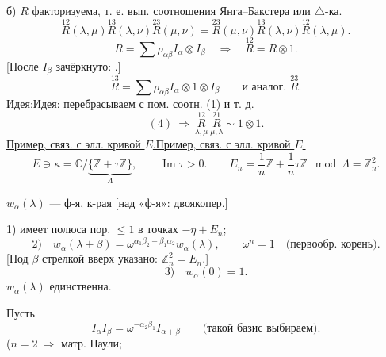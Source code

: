 \documentclass[11pt]{article}
\theoremstyle{definition}
\theoremstyle{remark}
\newcommand{\Unclear}[3]{%
  \begingroup\color{orange!70!black}%
  [Unresolved reading #1/#2: #3]\endgroup%
}
\renewcommand{\Unclear}[3]{%
  \begingroup\color{orange!65!black}%
  \ifmmode\text{[неясно: #3]}\else[неясно: #3]\fi\endgroup%
}
\let\DiplomaticMathUnderline\underline
\renewcommand{\underline}[1]{\ifmmode\DiplomaticMathUnderline{#1}\else\uline{#1}\fi}
\begin{document}
б) $R$ факторизуема, т. е. вып. соотношения Янга--Бакстера или $\triangle$-ка.
\begin{equation*}
\overset{12}{R}(\lambda,\mu)\overset{13}{R}(\lambda,\nu)\overset{23}{R}(\mu,\nu)
=\overset{23}{R}(\mu,\nu)\overset{13}{R}(\lambda,\nu)\overset{12}{R}(\lambda,\mu). \tag{4}
\end{equation*}
\begin{equation*}
R=\sum\rho_{\alpha\beta}I_\alpha\otimes I_\beta
\quad\Rightarrow\quad \overset{12}{R}=R\otimes1.
\end{equation*}
[После $I_\beta$ зачёркнуто:
\Unclear{GELFAND-P001165}{cancelled-r12}{$=\overset{12}{R}$; начало записи под штриховкой}.]
\begin{equation*}
\overset{13}{R}=\sum\rho_{\alpha\beta}I_\alpha\otimes1\otimes I_\beta
\qquad\text{и аналог. }\overset{23}{R}.
\end{equation*}
\underline{Идея:} перебрасываем с пом. соотн. (1) и т. д.
\begin{equation*}
(4)\ \Rightarrow\ 
\underset{\lambda,\mu}{\overset{12}{R}}\ 
\underset{\mu,\lambda}{\overset{21}{R}}\sim1\otimes1. \tag{5}
\end{equation*}
\underline{Пример, связ. с элл. кривой $E$.}
\begin{equation*}
E\ni\kappa=\mathbb C/\underbrace{\{\mathbb Z+\tau\mathbb Z\}}_{\Lambda},
\qquad \operatorname{Im}\tau>0.
\qquad
E_n=\frac1n\mathbb Z+\frac1n\tau\mathbb Z\ \bmod\Lambda
=\mathbb Z_n^2.
\end{equation*}
\Unclear{GELFAND-P001165}{curve-letter}{В записи $E\ni\kappa=\mathbb C/\{\mathbb Z+\tau\mathbb Z\}$
буква после $\ni$: $\kappa$ или $k$.}

$w_\alpha(\lambda)$ --- ф-я, к-рая [над «ф-я»: двоякопер.]

1) имеет полюса пор. $\le1$ в точках $-\eta+E_n$;
\begin{equation*}
2)\quad w_\alpha(\lambda+\beta)
=\omega^{\alpha_1\beta_2-\beta_1\alpha_2}w_\alpha(\lambda),
\qquad \omega^n=1\quad\text{(первообр. корень)}.
\end{equation*}
[Под $\beta$ стрелкой вверх указано: $\mathbb Z_n^2=E_n$.]
\begin{equation*}
3)\quad w_\alpha(0)=1.
\end{equation*}
$w_\alpha(\lambda)$ единственна.

Пусть
\begin{equation*}
I_\alpha I_\beta=\omega^{-\alpha_2\beta_1}I_{\alpha+\beta}
\qquad\text{(такой базис выбираем)}. \tag{6}
\end{equation*}
($n=2\ \Rightarrow$ матр. Паули;
\end{document}
